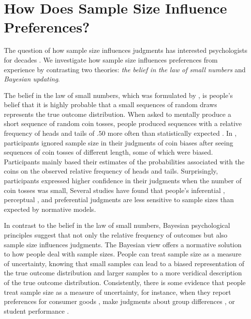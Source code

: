 \documentclass[a4paper, man, natbib, floatsintext]{apa6}
\begin{document}

\section{How Does Sample Size Influence Preferences?}
The question of how sample size influences judgments has interested psychologists for decades \citep[e.g.,][]{Tversky1971, Griffin1992}. We investigate how sample size influences preferences from experience by contrasting two theories: \textit{the belief in the law of small numbers} \citep{Tversky1971} and \textit{Bayesian updating}. 

The belief in the law of small numbers, which was formulated by \cite{Tversky1971}, is people's belief that it is highly probable that a small sequences of random draws represents the true outcome distribution. When asked to mentally produce a short sequence of random coin tosses, people produced sequences with a relative frequency of heads and tails of $.50$ more often than statistically expected \citep{Tversky1971}. In \cite{Griffin1992}, participants ignored sample size in their judgments of coin biases after seeing sequences of coin tosses of different length, some of which were biased. Participants mainly based their estimates of the probabilities associated with the coins on the observed relative frequency of heads and tails. Surprisingly, participants expressed higher confidence in their judgments when the number of coin tosses was small,  Several studies have found that people's inferential \citep[e.g.,][]{Kutzner2016}, perceptual \citep[e.g.,][]{Kvam2016}, and preferential judgments \citep[e.g.,][]{Powell2017} are less sensitive to sample sizes than expected by normative models.

In contrast to the belief in the law of small numbers, Bayesian psychological principles suggest that not only the relative frequency of outcomes but also sample size influences judgments. The Bayesian view offers a normative solution to how people deal with sample sizes. People can treat sample size as a measure of uncertainty, knowing that small samples can lead to a biased representation of the true outcome distribution and larger samples to a more veridical description of the true outcome distribution. Consistently, there is some evidence that people treat sample size as a measure of uncertainty, for instance, when they report preferences for consumer goods \citep{DeMartino2017}, make judgments about group differences \citep{Obrecht2010}, or student performance \citep{Fiedler2002}.
\end{document}
